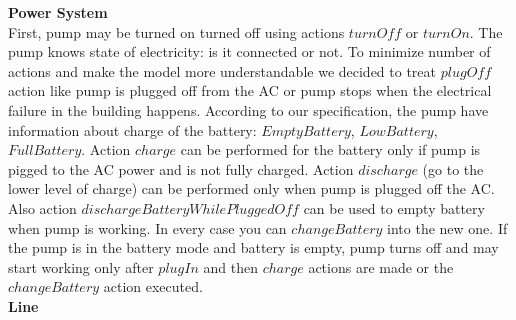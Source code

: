 \documentclass{article}
\begin{document}
\textbf{Power System} \\

First, pump may be turned on turned off using actions $turnOff$ or $turnOn$. The pump knows state of electricity: is it connected or not. To minimize number of actions and make the model more understandable we decided to treat $plugOff$ action like pump is plugged off from the AC or pump stops when the electrical failure in the building happens.
According to our specification, the pump have information about charge of the battery: $EmptyBattery$, $LowBattery$, $FullBattery$. Action $charge$ can be performed for the battery only if pump is pigged to the AC power and is not fully charged. Action $discharge$ (go to the lower level of charge) can be performed only when pump is plugged off the AC. Also action $dischargeBatteryWhilePluggedOff$ can be used to empty battery when pump is working. In every case you can $changeBattery$ into the new one.
If the pump is in the battery mode and battery is empty, pump turns off and may start working only after $plugIn$ and then $charge$ actions are made or the $changeBattery$ action executed.\\

\textbf{Line} \\
\end{document}
